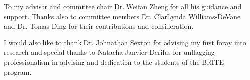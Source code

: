 To my advisor and committee chair Dr. Weifan Zheng for all his guidance and support. Thanks also to committee members Dr. ClarLynda Williams-DeVane and Dr. Tomas Ding for their contributions and consideration.


I would also like to thank Dr. Johnathan Sexton for advising my first foray into research and special thanks to Natacha Janvier-Derilus for unflagging professionalism in advising and dedication to the students of the BRITE program. 
